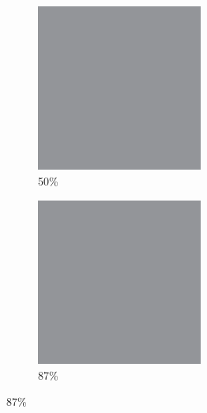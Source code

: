 \documentclass[12pt, fleqn]{report}                             %
\theoremstyle{break}                                            %
\begin{document}
\begin{figure}[ht!]
\begin{subfigure}[b]{0.4\linewidth}
          \includegraphics[width=0.6\textwidth]{Images/51/c.png}
          \caption{50\%}
        \end{subfigure}
        \begin{subfigure}[b]{0.4\linewidth}
          \includegraphics[width=0.6\textwidth]{Images/51/d.png}
          \caption{87\%}
        \end{subfigure}
      \end{figure}
\end{document}
